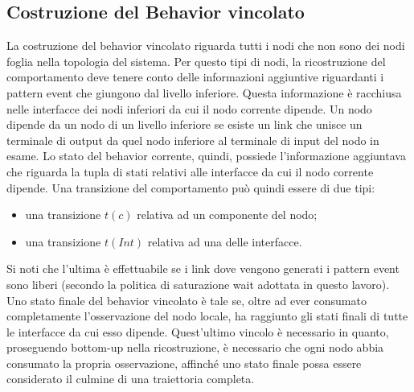 \subsection{Costruzione del Behavior vincolato}
La costruzione del behavior vincolato riguarda tutti i nodi che non sono dei nodi foglia nella topologia del sistema. Per questo tipi di nodi, la ricostruzione del comportamento deve tenere conto delle informazioni aggiuntive riguardanti i pattern event che giungono dal livello inferiore. Questa informazione è racchiusa nelle interfacce dei nodi inferiori da cui il nodo corrente dipende. Un nodo dipende da un nodo di un livello inferiore se esiste un link che unisce un terminale di output da quel nodo inferiore al terminale di input del nodo in esame. Lo stato del behavior corrente, quindi, possiede l'informazione aggiuntava che riguarda la tupla di stati relativi alle interfacce da cui il nodo corrente dipende. Una transizione del comportamento può quindi essere di due tipi:
\begin{itemize}
\item una transizione $t(c)$ relativa ad un componente del nodo;
\item una transizione $t(Int)$ relativa ad una delle interfacce.
\end{itemize} 
Si noti che l'ultima è effettuabile se i link dove vengono generati i pattern event sono liberi (secondo la politica di saturazione wait adottata in questo lavoro).
Uno stato finale del behavior vincolato è tale se, oltre ad ever consumato completamente l'osservazione del nodo locale, ha raggiunto gli stati finali di tutte le interfacce da cui esso dipende. Quest'ultimo vincolo è necessario in quanto, proseguendo bottom-up nella ricostruzione, è necessario che ogni nodo abbia consumato la propria osservazione, affinché uno stato finale possa essere considerato il culmine di una traiettoria completa.

